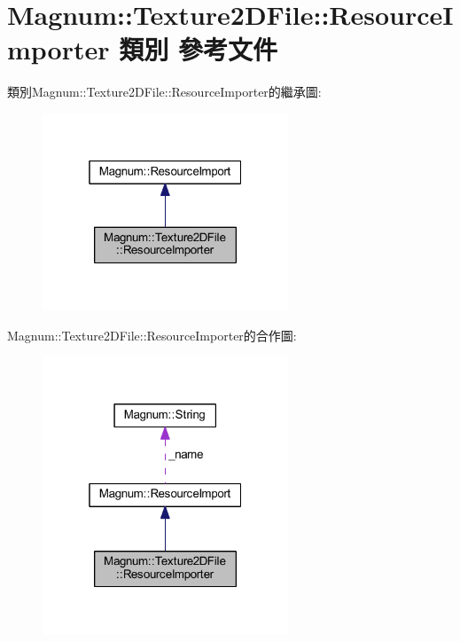 \hypertarget{class_magnum_1_1_texture2_d_file_1_1_resource_importer}{}\section{Magnum\+:\+:Texture2\+D\+File\+:\+:Resource\+Importer 類別 參考文件}
\label{class_magnum_1_1_texture2_d_file_1_1_resource_importer}


類別\+Magnum\+:\+:Texture2\+D\+File\+:\+:Resource\+Importer的繼承圖\+:\nopagebreak
\begin{figure}[H]
\begin{center}
\leavevmode
\includegraphics[width=208pt]{class_magnum_1_1_texture2_d_file_1_1_resource_importer__inherit__graph}
\end{center}
\end{figure}


Magnum\+:\+:Texture2\+D\+File\+:\+:Resource\+Importer的合作圖\+:\nopagebreak
\begin{figure}[H]
\begin{center}
\leavevmode
\includegraphics[width=208pt]{class_magnum_1_1_texture2_d_file_1_1_resource_importer__coll__graph}
\end{center}
\end{figure}
